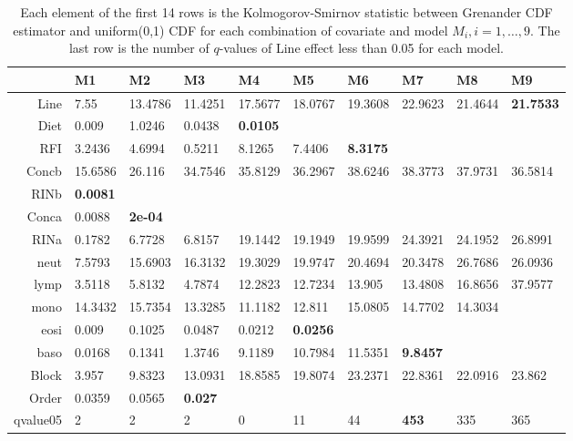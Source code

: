 \documentclass[12pt, letter]{article}\usepackage[]{graphicx}\usepackage[]{color}
\begin{document}
\begin{table}
\centering
\footnotesize
\begin{tabular}{|r|l|l|l|l|l|l|l|l|l|}
  \hline
 & M1 & M2 & M3 & M4 & M5 & M6 & M7 & M8 & M9 \\ 
  \hline
Line & 7.55 & 13.4786 & 11.4251 & 17.5677 & 18.0767 & 19.3608 & 22.9623 & 21.4644 & \textbf{21.7533} \\ \hline
  Diet & 0.009 & 1.0246 & 0.0438 & \textbf{0.0105} &  &  &  &  &  \\ \hline
  RFI & 3.2436 & 4.6994 & 0.5211 & 8.1265 & 7.4406 & \textbf{8.3175} &  &  &  \\ \hline
  Concb & 15.6586 & 26.116 & 34.7546 & 35.8129 & 36.2967 & 38.6246 & 38.3773 & 37.9731 & 36.5814 \\ \hline
  RINb & \textbf{0.0081} &  &  &  &  &  &  &  &  \\ \hline
  Conca & 0.0088 & \textbf{2e-04} &  &  &  &  &  &  &  \\ \hline
  RINa & 0.1782 & 6.7728 & 6.8157 & 19.1442 & 19.1949 & 19.9599 & 24.3921 & 24.1952 & 26.8991 \\ \hline
  neut & 7.5793 & 15.6903 & 16.3132 & 19.3029 & 19.9747 & 20.4694 & 20.3478 & 26.7686 & 26.0936 \\ \hline
  lymp & 3.5118 & 5.8132 & 4.7874 & 12.2823 & 12.7234 & 13.905 & 13.4808 & 16.8656 & 37.9577 \\ \hline
  mono & 14.3432 & 15.7354 & 13.3285 & 11.1182 & 12.811 & 15.0805 & 14.7702 & 14.3034 &  \\ \hline
  eosi & 0.009 & 0.1025 & 0.0487 & 0.0212 & \textbf{0.0256} &  &  &  &  \\ \hline
  baso & 0.0168 & 0.1341 & 1.3746 & 9.1189 & 10.7984 & 11.5351 & \textbf{9.8457} &  &  \\ \hline
  Block & 3.957 & 9.8323 & 13.0931 & 18.8585 & 19.8074 & 23.2371 & 22.8361 & 22.0916 & 23.862 \\ \hline
  Order & 0.0359 & 0.0565 & \textbf{0.027} &  &  &  &  &  &  \\ \hline
  qvalue05 & 2 & 2 & 2 & 0 & 11 & 44 & \textbf{453} & 335 & 365 \\ 
   \hline
\end{tabular}
\caption{Each element of the first 14 rows is the Kolmogorov-Smirnov statistic between Grenander CDF estimator and uniform(0,1) CDF for each combination of covariate and model $M_i, i = 1, \dots, 9$. The last row is the number of $q$-values  of Line effect less than 0.05 for each model.} 
\label{realdatatableks}
\end{table}
\end{document}
